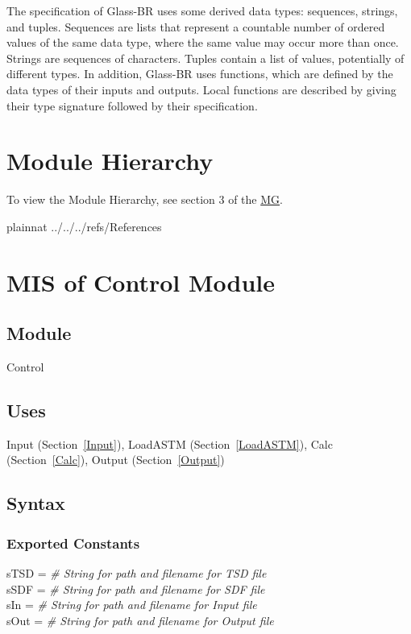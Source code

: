 \documentclass[12pt, titlepage]{article}
\newcommand{\progname}[1]{Glass-BR}
\begin{document}
\noindent
The specification of \progname{} uses some derived data types: sequences, strings, and
tuples. Sequences are lists that represent a countable number of ordered values of the same data type, where 
the same value may occur more than once. Strings are sequences of characters. 
Tuples contain a list of values, potentially of different types. 
In addition, \progname{} uses functions, which
are defined by the data types of their inputs and outputs. Local functions are
described by giving their type signature followed by their specification.

\section{Module Hierarchy} 

To view the Module Hierarchy, see section 3 of the \href{../MG/glassbr_mg.pdf}{MG}.

 {plainnat}
 {../../../refs/References}

\newpage


\section{MIS of Control Module} \label{Main}

\subsection{Module}

Control

\subsection{Uses}

Input (Section~\ref{Input}), LoadASTM (Section~\ref{LoadASTM}), Calc
(Section~\ref{Calc}), Output (Section~\ref{Output})

\subsection{Syntax}

\subsubsection {Exported Constants}

sTSD = \textit{\# String for path and filename for TSD file}\\
sSDF = \textit{\# String for path and filename for SDF file}\\
sIn = \textit{\# String for path and filename for Input file}\\
sOut = \textit{\# String for path and filename for Output file}
\end{document}
